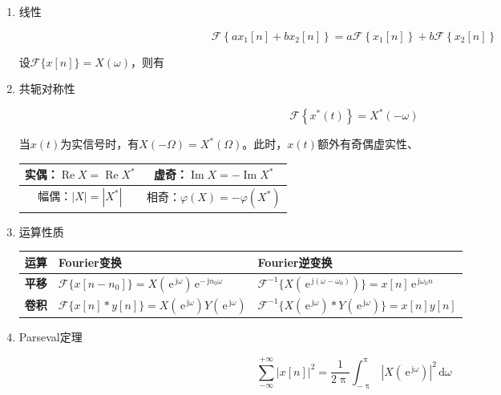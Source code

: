 \documentclass[UTF8,fontset=fandol,zihao=5]{ctexart}
\newcommand{\jj}{\,\mathrm{j}}
\newcommand{\ee}{\,\mathrm{e}}
\newcommand{\dd}{\,\mathrm{d}}
\newcommand{\FF}{\mathcal{F}}
\newcommand{\RRe}{\operatorname{Re}}
\newcommand{\IIm}{\operatorname{Im}}
\begin{document}
\begin{enumerate}
  \item 线性
  
  \[
  \FF \left\{ ax_1[n] + bx_2[n] \right\} = a \FF \left\{ x_1[n] \right\} + b \FF \left\{ x_2[n] \right\} 
  \]     

设$\displaystyle \FF \{ x[n] \} = X(\omega)$，则有

  \item 共轭对称性
  
  \[
  \FF \left\{ x^\ast(t) \right\} = X^\ast(-\omega)
  \]

  当$x(t)$为实信号时，有$\displaystyle X(-\varOmega) = X^\ast(\varOmega)$。此时，$x(t)$额外有奇偶虚实性、

    \begin{center}
    \renewcommand{\arraystretch}{1.5}
    \begin{tabular}{|c|c|}
    \hline
    实偶：$\RRe X=\RRe X^\ast$
    &
    虚奇：$\IIm X=-\IIm X^\ast$
    \\
    \hline
    幅偶：$|X|=|X^\ast|$
    &
    相奇：$\varphi(X)=-\varphi(X^\ast)$
    \\
    \hline
    \end{tabular}
    \end{center}

  \item 运算性质
    \begin{center}
    \begin{tabularx}{0.98\textwidth}{>{\bfseries}p{1.5cm}X X}
    \toprule
    运算 & Fourier变换 & Fourier逆变换 \\
    \midrule

    平移
    &
    $\displaystyle
    \FF \{ x[n-n_0] \}
    =
    X(\ee^{\jj\omega})\ee^{-\jj n_0 \omega}
    $
    &
    $\displaystyle
    \FF^{-1} \{ X(\ee^{\jj(\omega-\omega_0)}) \}
    =
    x[n]\ee^{\jj \omega_0 n}
    $
    \\

    卷积
    &
    $\displaystyle
    \FF \{ x[n]\ast y[n] \}
    =
    X(\ee^{\jj\omega})Y(\ee^{\jj\omega})
    $
    &
    $\displaystyle
    \FF^{-1}
    \{ X(\ee^{\jj\omega})\ast Y(\ee^{\jj\omega}) \}
    =x[n]y[n]
    $
    \\

    \bottomrule
    \end{tabularx}
    \end{center}

  \item Parseval定理
  
  \[
  \sum_{-\infty}^{+\infty} |x[n]|^2 = \frac{1}{2\uppi} \int_{-\uppi}^{\uppi} |X(\ee^{\jj\omega})|^2 \dd \omega
  \]

\end{enumerate}
\end{document}
